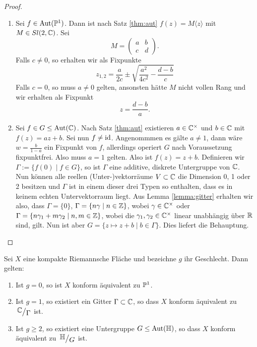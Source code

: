 \begin{proof}
  \begin{enumerate}
  \item Sei $f \in \Aut(\P^1)$. Dann ist nach Satz \ref{thm:aut} $f(z) = M\langle z \rangle$ mit $M
    \in Sl(2, \C)$. Sei
    \[
    M =
    \begin{pmatrix}
      a & b \\
      c & d
    \end{pmatrix}.
    \]
    Falls $c \neq 0$, so erhalten wir als Fixpunkte
    \[
    z_{1,2} = \frac{a}{2c} \pm \sqrt{\frac{a^2}{4 c^2} - \frac{d-b}{c}}
    \]
    Falls $c = 0$, so muss $a \neq 0$ gelten, ansonsten hätte $M$ nicht
    vollen Rang und wir erhalten als Fixpunkt
    \[
    z = \frac{d-b}{a}.
    \]
  \item Sei $f \in G \leq \Aut(\C)$. Nach Satz \ref{thm:aut}
    existieren $a \in \C^\times$ und $b \in \C$ mit $f(z) = az
    +b$. Sei nun $f \neq \id$. Angenommmen es gälte $a \neq 1$, dann
    wäre $w = \frac{b}{1-a}$ ein Fixpunkt von $f$, allerdings operiert
    $G$ nach Voraussetzung fixpunktfrei. Also muss $a = 1$
    gelten. Also ist $f(z) = z + b$. Definieren wir $\Gamma := \{f(0) \mid
    f \in G\}$, so ist $\Gamma$ eine additive, diskrete Untergruppe
    von $\C$. Nun können alle reellen (Unter-)vektorräume $V \subset
    \C$ die Dimension 0, 1 oder 2 besitzen und $\Gamma$ ist in einem
    dieser drei Typen so enthalten, dass es in keinem echten
    Untervektorraum liegt. Aus Lemma \ref{lemma:gitter} erhalten wir
    also, dass $\Gamma = \{0\}$, $\Gamma = \{ n \gamma \mid n \in \Z\}$,
    wobei $\gamma \in \C^\times$ oder $\Gamma = \{n \gamma_1 + m
    \gamma_2 \mid n,m \in \Z \}$, wobei die $\gamma_1, \gamma_2 \in
    \C^\times$ linear unabhängig über $\R$ sind, gilt. Nun ist aber $G
    = \{z \mapsto z + b \mid b \in \Gamma \}$. Dies liefert die Behauptung.
  \end{enumerate}
\end{proof}

\begin{thm}
  Sei $X$ eine kompakte Riemannsche Fläche und bezeichne $g$ ihr
  Geschlecht. Dann gelten:
  \begin{enumerate}
  \item Ist $g = 0$, so ist $X$ konform äquivalent zu $\P^1$.
  \item Ist $g = 1$, so existiert ein Gitter $\Gamma \subset \C$, so
    dass $X$ konform äquivalent zu $\quot{\C}{\Gamma}$ ist.
  \item Ist $g \geq 2$, so existiert eine Untergruppe $G \leq
    \Aut(\h)$, so dass $X$ konform äquivalent zu $\quot{\h}{G}$ ist.
  \end{enumerate}
\end{thm}

